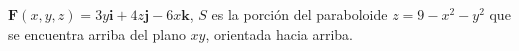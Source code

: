 \item $\mathbf{F}(x, y, z) = 3y \mathbf{i} + 4z \mathbf{j} - 6x \mathbf{k}$, $S$ es la porción del paraboloide $z = 9 - x^2 - y^2$ que se encuentra arriba del plano $xy$, orientada hacia arriba.
